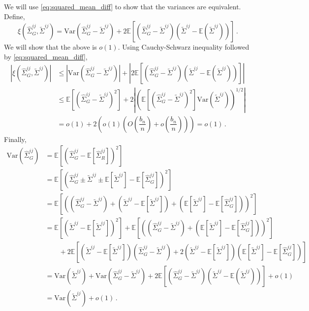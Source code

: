 \documentclass[11pt]{article}
\newcommand{\E}{\mathbb{E}}
\newcommand{\Var}{\text{Var}}
\theoremstyle{remark}
\begin{document}
%
We will use \eqref{eq:squared_mean_diff} to show that the variances are equivalent. Define,
\[
\xi\left(\hat{\Sigma}_{G}^{ij}, \tilde{\Sigma}^{ij} \right) = \Var\left(\hat{\Sigma}_{G}^{ij} - \tilde{\Sigma}^{ij} \right) + 2 \E\left[ \left(\hat{\Sigma}_{G}^{ij} -  \tilde{\Sigma}^{ij} \right) \left(\tilde{\Sigma}^{ij}  - \E \left( \tilde{\Sigma}^{ij} \right) \right) \right]\,.
\]
We will show that the above is $o(1)$. Using Cauchy-Schwarz inequality followed by \eqref{eq:squared_mean_diff},
\begin{align*}
\left|  \xi\left(\hat{\Sigma}_{G}^{ij}, \tilde{\Sigma}^{ij} \right) \right| & \leq \left| \Var\left(\hat{\Sigma}_{G}^{ij} -  \tilde{\Sigma}^{ij} \right) \right| + \left| 2 \E\left[ \left(\hat{\Sigma}_{G}^{ij} - \tilde{\Sigma}^{ij} \right) \left(\tilde{\Sigma}^{ij}  - \E \left( \tilde{\Sigma}^{ij} \right) \right) \right]\right| \\ 
& \leq \E\left[\left(\hat{\Sigma}_{G}^{ij} -  \tilde{\Sigma}^{ij} \right)^2 \right] + 2 \left| \left(\E\left[ \left(\hat{\Sigma}_{G}^{ij} - \tilde{\Sigma}^{ij} \right)^2 \right]  \Var\left(\tilde{\Sigma}^{ij}  \right)   \right)^{1/2}\right| \\ 
& = o(1) + 2\left(o(1) \left(O\left( \dfrac{b_n}{n}\right)  + o\left( \dfrac{b_n}{n}\right) \right)  \right) = o(1)\,.
\end{align*}
%
Finally,
\begin{align*}
 \Var\left(\hat{\Sigma}_{G}^{ij} \right)  & = \E \left[ \left(\hat{\Sigma}_{G}^{ij}  - \E \left[\hat{\Sigma}_{R}^{ij}  \right] \right)^2 \right]\\
& = \E \left[ \left(\hat{\Sigma}_{G}^{ij} \pm \tilde{\Sigma}^{ij} \pm \E \left[ \tilde{\Sigma}^{ij}\right] - \E \left[\hat{\Sigma}_{G}^{ij}  \right] \right)^2 \right]\\
& = \E\left[ \left( \left(\hat{\Sigma}_{G}^{ij} - \tilde{\Sigma}^{ij} \right) + \left(\tilde{\Sigma}^{ij}  - \E\left[\tilde{\Sigma}^{ij}\right]\right) + \left(\E\left[\tilde{\Sigma}^{ij}\right] - \E \left[\hat{\Sigma}_{G}^{ij}  \right] \right)  \right)^2 \right] \\ 
& =  \E\left[ \left(\tilde{\Sigma}^{ij}  - \E\left[\tilde{\Sigma}^{ij}\right]\right)^2 \right] + \E \left[ \left(\left(\hat{\Sigma}_{G}^{ij} - \tilde{\Sigma}^{ij} \right) + \left(\E\left[\tilde{\Sigma}^{ij}\right] - \E \left[\hat{\Sigma}_{G}^{ij}  \right] \right) \right)^2 \right] \\
& \quad \quad + 2\E\left[\left(\tilde{\Sigma}^{ij}  - \E\left[\tilde{\Sigma}^{ij}\right]\right) \left(\hat{\Sigma}_{G}^{ij} - \tilde{\Sigma}^{ij} \right) + 2 \left(\tilde{\Sigma}^{ij}  - \E\left[\tilde{\Sigma}^{ij}\right]\right) \left(\E \left[\tilde{\Sigma}^{ij}\right] - \E \left[\hat{\Sigma}_{G}^{ij}  \right] \right)\right]\\
& = \Var\left( \tilde{\Sigma}^{ij}\right) + \Var\left(\hat{\Sigma}_{G}^{ij} - \tilde{\Sigma}^{ij} \right) + 2 \E\left[ \left(\hat{\Sigma}_{G}^{ij} -  \tilde{\Sigma}^{ij} \right) \left(\tilde{\Sigma}^{ij}  - \E \left( \tilde{\Sigma}^{ij} \right) \right) \right] + o(1)\\
& = \Var\left( \tilde{\Sigma}^{ij}\right) + o(1)\,.
\end{align*}
\end{document}
